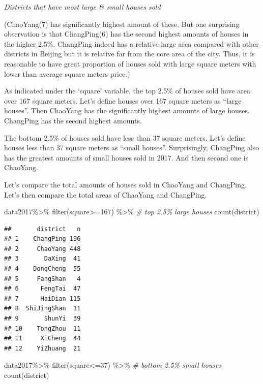 \documentclass[
]{article}
\newenvironment{Shaded}{\begin{snugshade}}{\end{snugshade}}
\newcommand{\CommentTok}[1]{\textcolor[rgb]{0.56,0.35,0.01}{\textit{#1}}}
\newcommand{\DecValTok}[1]{\textcolor[rgb]{0.00,0.00,0.81}{#1}}
\newcommand{\FunctionTok}[1]{\textcolor[rgb]{0.00,0.00,0.00}{#1}}
\newcommand{\NormalTok}[1]{#1}
\newcommand{\SpecialCharTok}[1]{\textcolor[rgb]{0.00,0.00,0.00}{#1}}
\begin{document}
\emph{Districts that have most large \& small houses sold}

(ChaoYang(7) has significantly highest amount of these. But one
surprising observation is that ChangPing(6) has the second highest
amounts of houses in the higher 2.5\%. ChangPing indeed has a relative
large area compared with other districts in Beijing but it is relative
far from the core area of the city. Thus, it is reasonable to have great
proportion of houses sold with large square meters with lower than
average square meters price.)

As indicated under the `square' variable, the top 2.5\% of houses sold
have area over 167 square meters. Let's define houses over 167 square
meters as ``large houses''. Then ChaoYang has the significantly highest
amounts of large houses. ChangPing has the second highest amounts.

The bottom 2.5\% of houses sold have less than 37 square meters. Let's
define houses less than 37 square meters as ``small houses''.
Surprisingly, ChangPing also has the greatest amounts of small houses
sold in 2017. And then second one is ChaoYang.

Let's compare the total amounts of houses sold in ChaoYang and
ChangPing. Let's then compare the total areas of ChaoYang and ChangPing.

\begin{Shaded}
\begin{Highlighting}[]
\NormalTok{data2017}\SpecialCharTok{\%\textgreater{}\%}
  \FunctionTok{filter}\NormalTok{(square}\SpecialCharTok{\textgreater{}=}\DecValTok{167}\NormalTok{) }\SpecialCharTok{\%\textgreater{}\%} \CommentTok{\# top 2.5\% large houses}
  \FunctionTok{count}\NormalTok{(district)}
\end{Highlighting}
\end{Shaded}

\begin{verbatim}
##       district   n
## 1    ChangPing 196
## 2     ChaoYang 448
## 3       DaXing  41
## 4    DongCheng  55
## 5     FangShan   4
## 6      FengTai  47
## 7      HaiDian 115
## 8  ShiJingShan  11
## 9       ShunYi  39
## 10    TongZhou  11
## 11     XiCheng  44
## 12    YiZhuang  21
\end{verbatim}

\begin{Shaded}
\begin{Highlighting}[]
\NormalTok{data2017}\SpecialCharTok{\%\textgreater{}\%}
  \FunctionTok{filter}\NormalTok{(square}\SpecialCharTok{\textless{}=}\DecValTok{37}\NormalTok{) }\SpecialCharTok{\%\textgreater{}\%} \CommentTok{\# bottom 2.5\% small houses}
  \FunctionTok{count}\NormalTok{(district)}
\end{Highlighting}
\end{Shaded}
\end{document}

